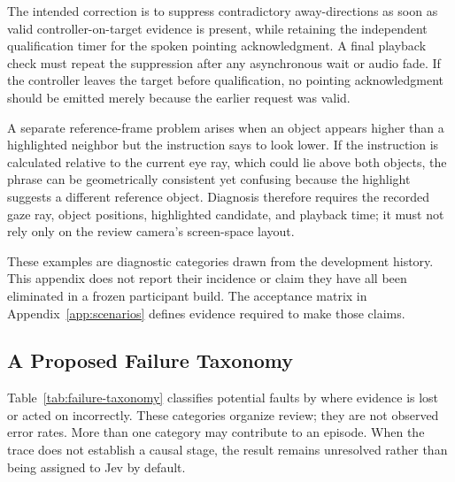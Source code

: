 The intended correction is to suppress contradictory away-directions as soon as valid controller-on-target evidence is present, while retaining the independent qualification timer for the spoken pointing acknowledgment. A final playback check must repeat the suppression after any asynchronous wait or audio fade. If the controller leaves the target before qualification, no pointing acknowledgment should be emitted merely because the earlier request was valid.

A separate reference-frame problem arises when an object appears higher than a highlighted neighbor but the instruction says to look lower. If the instruction is calculated relative to the current eye ray, which could lie above both objects, the phrase can be geometrically consistent yet confusing because the highlight suggests a different reference object. Diagnosis therefore requires the recorded gaze ray, object positions, highlighted candidate, and playback time; it must not rely only on the review camera's screen-space layout.

These examples are diagnostic categories drawn from the development history. This appendix does not report their incidence or claim they have all been eliminated in a frozen participant build. The acceptance matrix in Appendix~\ref{app:scenarios} defines evidence required to make those claims.


\subsection{A Proposed Failure Taxonomy}
Table~\ref{tab:failure-taxonomy} classifies potential faults by where evidence is lost or acted on incorrectly. These categories organize review; they are not observed error rates. More than one category may contribute to an episode. When the trace does not establish a causal stage, the result remains unresolved rather than being assigned to Jev by default.

